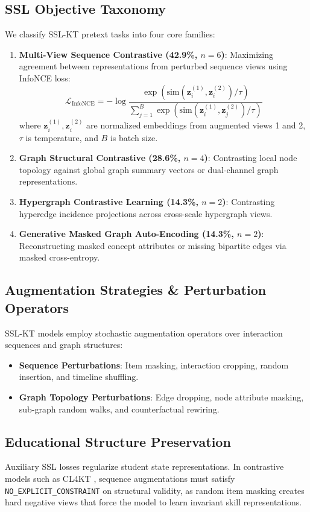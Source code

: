 \documentclass[journal]{IEEEtran}
\begin{document}
\subsection{SSL Objective Taxonomy}
We classify SSL-KT pretext tasks into four core families:
\begin{enumerate}
    \item \textbf{Multi-View Sequence Contrastive (42.9\%, $n=6$)}: Maximizing agreement between representations from perturbed sequence views using InfoNCE loss:
    \begin{equation}
    \mathcal{L}_{\text{InfoNCE}} = -\log \frac{\exp\left(\text{sim}(\mathbf{z}_i^{(1)}, \mathbf{z}_i^{(2)}) / \tau\right)}{\sum_{j=1}^B \exp\left(\text{sim}(\mathbf{z}_i^{(1)}, \mathbf{z}_j^{(2)}) / \tau\right)}
    \end{equation}
    where $\mathbf{z}_i^{(1)}, \mathbf{z}_i^{(2)}$ are normalized embeddings from augmented views 1 and 2, $\tau$ is temperature, and $B$ is batch size.
    \item \textbf{Graph Structural Contrastive (28.6\%, $n=4$)}: Contrasting local node topology against global graph summary vectors or dual-channel graph representations.
    \item \textbf{Hypergraph Contrastive Learning (14.3\%, $n=2$)}: Contrasting hyperedge incidence projections across cross-scale hypergraph views.
    \item \textbf{Generative Masked Graph Auto-Encoding (14.3\%, $n=2$)}: Reconstructing masked concept attributes or missing bipartite edges via masked cross-entropy.
\end{enumerate}

\subsection{Augmentation Strategies \& Perturbation Operators}
SSL-KT models employ stochastic augmentation operators over interaction sequences and graph structures:
\begin{itemize}
    \item \textbf{Sequence Perturbations}: Item masking, interaction cropping, random insertion, and timeline shuffling.
    \item \textbf{Graph Topology Perturbations}: Edge dropping, node attribute masking, sub-graph random walks, and counterfactual rewiring.
\end{itemize}

\subsection{Educational Structure Preservation}
Auxiliary SSL losses regularize student state representations. In contrastive models such as CL4KT \cite{KT039_CL4KT_2022}, sequence augmentations must satisfy \texttt{NO\_EXPLICIT\_CONSTRAINT} on structural validity, as random item masking creates hard negative views that force the model to learn invariant skill representations.
\end{document}
